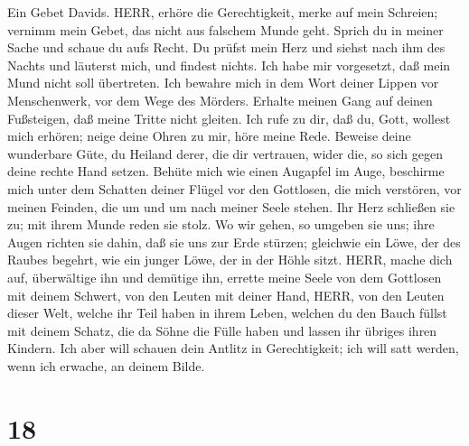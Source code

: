  Ein Gebet Davids. HERR, erhöre die Gerechtigkeit, merke auf
mein Schreien; vernimm mein Gebet, das nicht aus falschem Munde geht.
 Sprich du in meiner Sache und schaue du aufs Recht.
 Du prüfst mein Herz und siehst nach ihm des Nachts und
läuterst mich, und findest nichts. Ich habe mir vorgesetzt, daß mein
Mund nicht soll übertreten.  Ich bewahre mich in dem Wort
deiner Lippen vor Menschenwerk, vor dem Wege des Mörders. 
Erhalte meinen Gang auf deinen Fußsteigen, daß meine Tritte nicht
gleiten.  Ich rufe zu dir, daß du, Gott, wollest mich
erhören; neige deine Ohren zu mir, höre meine Rede.  Beweise
deine wunderbare Güte, du Heiland derer, die dir vertrauen, wider die,
so sich gegen deine rechte Hand setzen.  Behüte mich wie
einen Augapfel im Auge, beschirme mich unter dem Schatten deiner Flügel
 vor den Gottlosen, die mich verstören, vor meinen Feinden,
die um und um nach meiner Seele stehen.  Ihr Herz schließen
sie zu; mit ihrem Munde reden sie stolz.  Wo wir gehen, so
umgeben sie uns; ihre Augen richten sie dahin, daß sie uns zur Erde
stürzen;  gleichwie ein Löwe, der des Raubes begehrt, wie
ein junger Löwe, der in der Höhle sitzt.  HERR, mache dich
auf, überwältige ihn und demütige ihn, errette meine Seele von dem
Gottlosen mit deinem Schwert,  von den Leuten mit deiner
Hand, HERR, von den Leuten dieser Welt, welche ihr Teil haben in ihrem
Leben, welchen du den Bauch füllst mit deinem Schatz, die da Söhne die
Fülle haben und lassen ihr übriges ihren Kindern.  Ich aber
will schauen dein Antlitz in Gerechtigkeit; ich will satt werden, wenn
ich erwache, an deinem Bilde.

\hypertarget{section-17}{%
\section{18}\label{section-17}}

